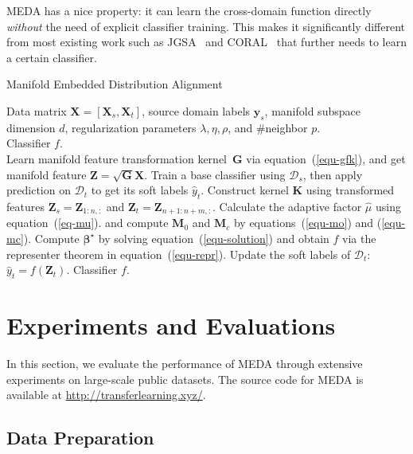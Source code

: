 \documentclass[sigconf]{acmart}
\begin{document}
MEDA has a nice property: it can learn the cross-domain function directly \textit{without} the need of explicit classifier training. This makes it significantly different from most existing work such as JGSA~\cite{zhang2017joint} and CORAL~\cite{sun2016return} that further needs to learn a certain classifier.

\begin{algorithm}[t!] 
	\caption{Manifold Embedded Distribution Alignment}  
	\label{algo-meda}  
	\renewcommand{\algorithmicrequire}{\textbf{Input:}} 
	\renewcommand{\algorithmicensure}{\textbf{Output:}}
	\begin{algorithmic}[1]  
		\REQUIRE 
		Data matrix $\mathbf{X}=[\mathbf{X}_s,\mathbf{X}_t]$, source domain labels $\mathbf{y}_s$, manifold subspace dimension $d$, regularization parameters $\lambda,\eta,\rho$, and \#neighbor $p$.\\
		\ENSURE 
		Classifier $f$.\\
		\STATE Learn manifold feature transformation kernel~$\mathbf{G}$ via equation~(\ref{equ-gfk}), and get manifold feature $\mathbf{Z}=\sqrt{\mathbf{G}} \mathbf{X}$.
		\STATE Train a base classifier using $\mathcal{D}_s$, then apply prediction on $\mathcal{D}_t$ to get its soft labels $\hat{y}_t$. 
		\STATE Construct kernel $\mathbf{K}$ using transformed features $\mathbf{Z}_s=\mathbf{Z}_{1:n,:}$ and $\mathbf{Z}_t=\mathbf{Z}_{n+1:n+m,:}$.
		\REPEAT 
		\STATE Calculate the adaptive factor $\hat{\mu}$ using equation~(\ref{eq-mu}).
		 and compute $\mathbf{M}_0$ and $\mathbf{M}_c$ by equations~(\ref{equ-mo}) and (\ref{equ-mc}).
		\STATE Compute $\bm{\beta}^\star$ by solving equation~(\ref{equ-solution}) and obtain $f$ via the representer theorem in equation~(\ref{equ-repr}).
		\STATE Update the soft labels of $\mathcal{D}_t$: $\hat{y}_t=f(\mathbf{Z}_t)$.
		\RETURN Classifier $f$.  
	\end{algorithmic}  
\end{algorithm}

\section{Experiments and Evaluations}
\label{sec-exp}
In this section, we evaluate the performance of MEDA through extensive experiments on large-scale public datasets. The source code for MEDA is available at \url{http://transferlearning.xyz/}.

\subsection{Data Preparation}
\label{sec-exp-data}
\end{document}
